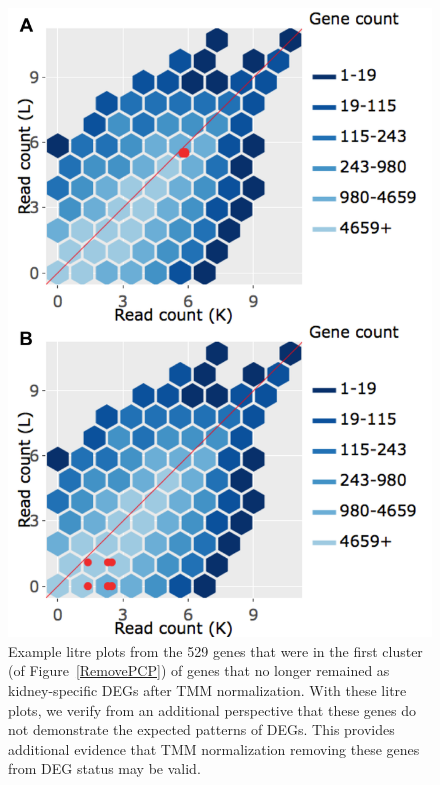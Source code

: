 \documentclass{article}
\begin{document}
\null
\begin{figure}[t!]
\centerline{\includegraphics[width=0.7\columnwidth]{../Dashboards/exampleRemove.png}}
\caption{Example litre plots from the 529 genes that were in the first cluster (of Figure~\ref{RemovePCP}) of genes that no longer remained as kidney-specific DEGs after TMM normalization. With these litre plots, we verify from an additional perspective that these genes do not demonstrate the expected patterns of DEGs. This provides additional evidence that TMM normalization removing these genes from DEG status may be valid.
\label{RemovedLitre}}
\end{figure}
\end{document}
